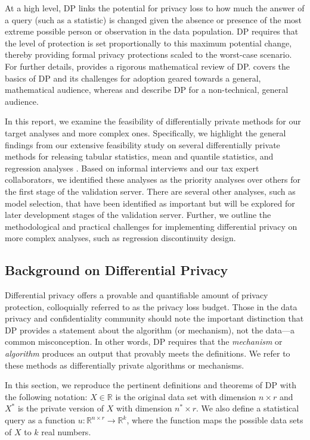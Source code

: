 At a high level, DP links the potential for privacy loss to how much the answer of a query (such as a statistic) is changed given the absence or presence of the most extreme possible person or observation in the data population. DP requires that the level of protection is set proportionally to this maximum potential change, thereby providing formal privacy protections scaled to the worst-case scenario. For further details, \citet{dwork2014algorithmic} provides a rigorous mathematical review of DP. \citet{bowen2021philosophy} covers the basics of DP and its challenges for adoption geared towards a general, mathematical audience, whereas \citet{nissim2017differential} and \citet{snoke2019differential} describe DP for a non-technical, general audience. 

In this report, we examine the feasibility of differentially private methods for our target analyses and more complex ones. Specifically, we highlight the general findings from our extensive feasibility study on several differentially private methods for releasing tabular statistics, mean and quantile statistics, and regression analyses \citep{barrientos2021}. Based on informal interviews and our tax expert collaborators, we identified these analyses as the priority analyses over others for the first stage of the validation server. There are several other analyses, such as model selection, that have been identified as important but will be explored for later development stages of the validation server. Further, we outline the methodological and practical challenges for implementing differential privacy on more complex analyses, such as regression discontinuity design.

\subsection{Background on Differential Privacy}\label{subsec:dp}
Differential privacy offers a provable and quantifiable amount of privacy protection, colloquially referred to as the privacy loss budget. Those in the data privacy and confidentiality community should note the important distinction that DP provides a statement about the algorithm (or mechanism), not the data---a common misconception. In other words, DP requires that the \textit{mechanism} or \textit{algorithm} produces an output that provably meets the definitions. We refer to these methods as differentially private algorithms or mechanisms.

In this section, we reproduce the pertinent definitions and theorems of DP with the following notation: $X\in\mathbb{R}$ is the original data set  with dimension ${n\times r}$ and $X^*$ is the private version of $X$ with dimension ${n^*\times r}$. We also define a statistical query as a function $u:\mathbb{R}^{n\times r}\rightarrow\mathbb{R}^k$, where the function maps the possible data sets of $X$ to $k$ real numbers.

